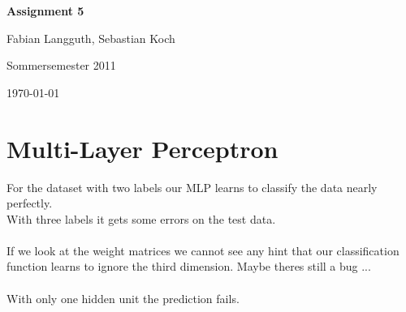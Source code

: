 



\begin{center}
    \huge {\bf Assignment 5}
    
    \small Fabian Langguth, Sebastian Koch
    
    Sommersemester 2011
    
    \today
\end{center}
\section*{Multi-Layer Perceptron} %
\label{sec:multi_layer_perceptron}

For the dataset with two labels our MLP learns to classify the data nearly perfectly.\\
With three labels it gets some errors on the test data.\\
\\
If we look at the weight matrices we cannot see any hint that our classification function learns to ignore the third dimension. Maybe theres still a bug ...\\
\\
With only one hidden unit the prediction fails.\\








